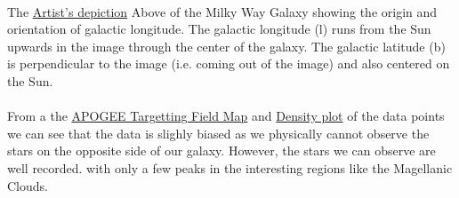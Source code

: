 \documentclass{article}
\begin{document}
\paragraph{}
The \hyperref[fig:1]{Artist's depiction} Above of the Milky Way Galaxy showing the origin and orientation of galactic longitude. The galactic longitude (l) runs from the Sun upwards in the image through the center of the galaxy. The galactic latitude (b) is perpendicular to the image (i.e. coming out of the image) and also centered on the Sun.

\paragraph{}
From a the \hyperref[fig:2]{APOGEE Targetting Field Map} and \hyperref[fig:3]{Density plot} of the data points we can see that the data is slighly biased as we physically cannot observe the stars on the opposite side of our galaxy. However, the stars we can observe are well recorded. with only a few peaks in the interesting regions like the Magellanic Clouds.
\end{document}
